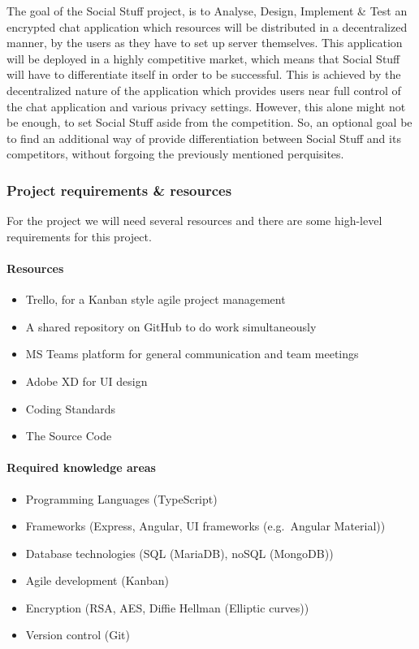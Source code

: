 The goal of the Social Stuff project, is to Analyse, Design, Implement \& Test an encrypted chat application which
resources will be distributed in a decentralized manner, by the users as they have to set up server themselves.
This application will be deployed in a highly competitive market, which means that Social Stuff will have to
differentiate itself in order to be successful.
This is achieved by the decentralized nature of the application which provides users near full control of the
chat application and various privacy settings.
However, this alone might not be enough, to set Social Stuff aside from the competition.
So, an optional goal be to find an additional way of provide differentiation between Social Stuff and its competitors,
without forgoing the previously mentioned perquisites.

\subsubsection{Project requirements \& resources}

For the project we will need several resources and there are some high-level requirements for this project.

\paragraph{Resources}
\begin{itemize}
    \item Trello, for a Kanban style agile project management
    \item A shared repository on GitHub to do work simultaneously
    \item MS Teams platform for general communication and team meetings
    \item Adobe XD for UI design
    \item Coding Standards
    \item The Source Code
\end{itemize}

\paragraph{Required knowledge areas}
\begin{itemize}
    \item Programming Languages (TypeScript)
    \item Frameworks (Express, Angular, UI frameworks (e.g.\ Angular Material))
    \item Database technologies (SQL (MariaDB), noSQL (MongoDB))
    \item Agile development (Kanban)
    \item Encryption (RSA, AES, Diffie Hellman (Elliptic curves))
    \item Version control (Git)
\end{itemize}

